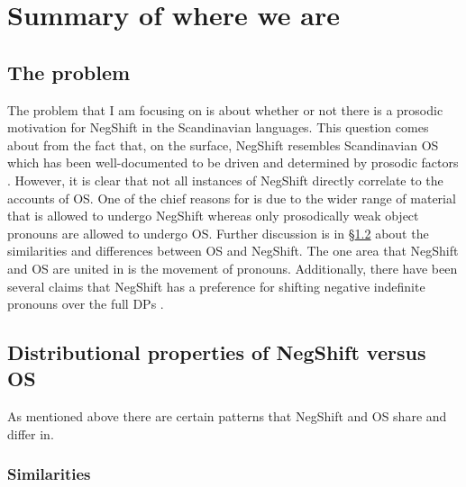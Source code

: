 \documentclass[12pt, letterpaper]{article}
\begin{document}
\section{Summary of where we are} \label{sec:RN}
\subsection{The problem} \label{sec:PROBLEM}

\ea The problem that I am focusing on is about whether or not there is a prosodic motivation for NegShift in the Scandinavian languages. 
\ex This question comes about from the fact that, on the surface, NegShift resembles Scandinavian OS which has been well-documented to be driven and determined by prosodic factors \citep{erteschik-shirSoundPatternsSyntax2005,erteschik-shirScandinavianObjectShift2017,erteschik-shirVariationMainlandScandinavian2019,brinkerhoffMATCHINGPhrasesNorwegian2020}.
\ex However, it is clear that not all instances of NegShift directly correlate to the accounts of OS. One of the chief reasons for is due to the wider range of material that is allowed to undergo NegShift whereas only prosodically weak object pronouns are allowed to undergo OS. Further discussion is in §\ref{sec:DISTRIBUTION} about the similarities and differences between OS and NegShift.
\ex The one area that NegShift and OS are united in is the movement of pronouns. Additionally, there have been several claims that NegShift has a preference for shifting negative indefinite pronouns over the full DPs \citep{christensenInterfacesNegationSyntax2005,penkaNegativeIndefinites2011}. 
\z 

\subsection{Distributional properties of NegShift versus OS} \label{sec:DISTRIBUTION}

\ea As mentioned above there are certain patterns that NegShift and OS share and differ in.
\z

\subsubsection{Similarities} \label{sec:SIM}
\end{document}
